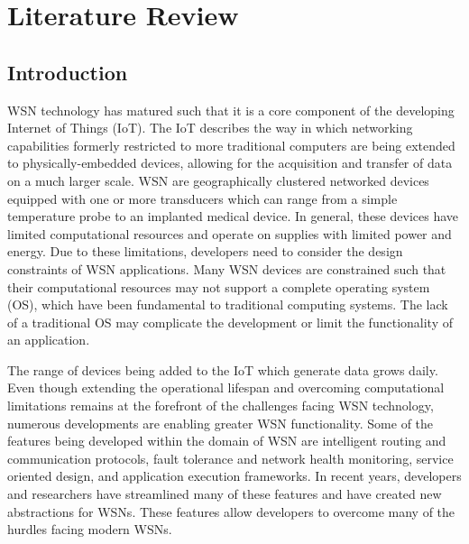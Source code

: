 \chapter{Literature Review} %
\label{LitReview}

\section{Introduction}
WSN technology has matured such that it is a core component of the developing Internet of Things (IoT). The IoT describes the way in which networking capabilities formerly restricted to more traditional computers are being extended to physically-embedded devices, allowing for the acquisition and transfer of data on a much larger scale. WSN are geographically clustered networked devices equipped with one or more transducers which can range from a simple temperature probe to an implanted medical device. In general, these devices have limited computational resources and operate on supplies with limited power and energy. Due to these limitations, developers need to consider the design constraints of WSN applications. Many WSN devices are constrained such that their computational resources may not support a complete operating system (OS), which have been  fundamental to traditional computing systems. The lack of a traditional OS may complicate the development or limit the functionality of an application.

The range of devices being added to the IoT which generate data grows daily. Even though extending the operational lifespan and overcoming computational limitations remains at the forefront of the challenges facing WSN technology, numerous developments are enabling  greater WSN functionality. Some of the features being developed within the domain of WSN are intelligent routing and communication protocols, fault tolerance and network health monitoring, service oriented design, and application execution frameworks. In recent years, developers and researchers have streamlined many of these features and have created new abstractions for WSNs. These features allow developers to overcome many of the hurdles facing modern WSNs. 


